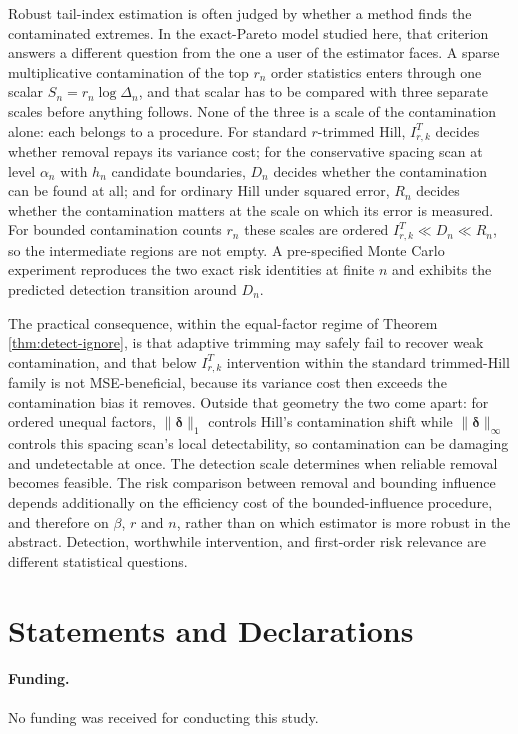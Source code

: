 \documentclass[11pt]{article}
\begin{document}
Robust tail-index estimation is often judged by whether a method finds the
contaminated extremes.  In the exact-Pareto model studied here, that criterion
answers a different question from the one a user of the estimator faces.  A
sparse multiplicative contamination of the top $r_n$ order statistics enters
through one scalar $S_n=r_n\log\Delta_n$, and that scalar has to be compared
with three separate scales before anything follows.  None of the three is a
scale of the contamination alone: each belongs to a procedure.  For standard
$r$-trimmed Hill, $I^{T}_{r,k}$ decides whether removal repays its variance
cost; for the conservative spacing scan at level $\alpha_n$ with $h_n$
candidate boundaries, $D_n$ decides whether the contamination can be found at
all; and for ordinary Hill under squared error, $R_n$ decides whether the
contamination matters at the scale on which its error is measured.  For bounded contamination counts $r_n$ these scales are ordered
$I^{T}_{r,k}\ll D_n\ll R_n$, so the intermediate regions are not empty.  A
pre-specified Monte Carlo experiment reproduces the two exact risk identities
at finite $n$ and exhibits the predicted detection transition around $D_n$.

The practical consequence, within the equal-factor regime of Theorem
\ref{thm:detect-ignore}, is that adaptive trimming may safely fail to recover
weak contamination, and that below $I^{T}_{r,k}$ intervention within the
standard trimmed-Hill family is not MSE-beneficial, because its variance cost
then exceeds the contamination bias it removes.  Outside that geometry the two
come apart: for ordered unequal factors, $\|\boldsymbol\delta\|_1$ controls
Hill's contamination shift while $\|\boldsymbol\delta\|_\infty$ controls this
spacing scan's local detectability, so contamination can be damaging and
undetectable at once.  The detection scale determines
when reliable removal becomes feasible.  The risk comparison between removal and bounding influence
depends additionally on the efficiency cost of the bounded-influence procedure,
and therefore on $\beta$, $r$ and $n$, rather than on which estimator is more
robust in the abstract.  Detection,
worthwhile intervention, and first-order risk relevance are different
statistical questions.

\section*{Statements and Declarations}

\paragraph{Funding.}
No funding was received for conducting this study.
\end{document}
